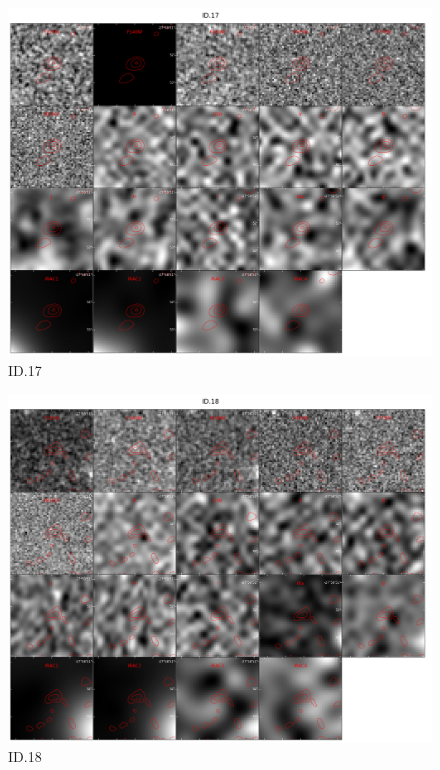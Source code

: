 \begin{figure}[tbp]
\centering \includegraphics[width=160mm]{Matched/ASPECS_Cutout_16.jpg}
\caption{ID.17}
\label{fig:Match_Three}
\end{figure}

\begin{figure}[tbp]
\centering \includegraphics[width=160mm]{Matched/ASPECS_Cutout_17.jpg}
\caption{ID.18}
\label{fig:Match_Three}
\end{figure}


